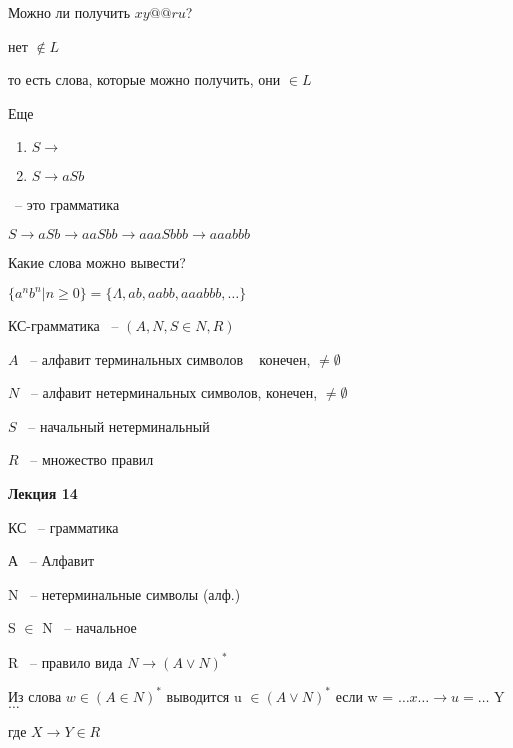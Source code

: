 \documentclass[russian]{lecture-notes}
\begin{document}
    Можно ли получить $xy@@ru$?

    нет $\notin L$

    то есть слова, которые можно получить, они $\in L$

    \begin{example}

        Еще

        \begin{enumerate}
            \item{
                $S \rightarrow$
            }
            \item{
                $S \rightarrow aSb$
            }
        \end{enumerate}

        ~-- это грамматика

        $S \rightarrow aSb \rightarrow aaSbb \rightarrow aaaSbbb \rightarrow aaabbb$

        Какие слова можно вывести?

        $\{ a^n b^n | n \geq 0\} = \{ \Lambda, ab, aabb, aaabbb, \dots  \}$
    \end{example}

    \begin{definition}
        КС-грамматика ~-- $(A, N, S \in N, R)$

        $A$ ~-- алфавит терминальных символов ~ конечен, $\neq \emptyset$

        $N$ ~-- алфавит нетерминальных символов, конечен, $\neq \emptyset$

        $S$ ~-- начальный нетерминальный

        $R$ ~-- множество правил
    \end{definition}

\textbf{Лекция 14}

	КС ~-- грамматика

	А ~-- Алфавит

	N ~-- нетерминальные символы (алф.)

	S $\in$ N ~-- начальное

	R ~-- правило вида $N \rightarrow (A \lor N)^{*}$

	\begin{definition}

		Из слова $w \in ( A \in N)^{*}$ выводится u $\in (A \lor N)^{*}$ если w = $\dots x \dots \rightarrow u = \dots $ Y $\dots$

		где $X \rightarrow Y \in R$
		\end{definition}
\end{document}
